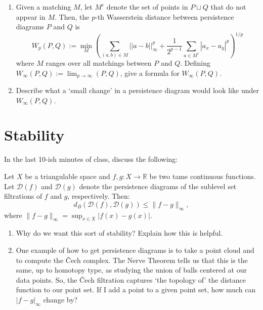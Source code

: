 \documentclass{article}
\begin{document}
\begin{enumerate}[itemsep=2in]
        points to match to the diagonal. What is the $d_{\infty}$ distance from
        a point to the diagonal?
    \newpage
    \item Given a matching $M$, let $M^c$ denote the set of points in $P \sqcup
        Q$ that do not appear in $M$.  Then, the $p$-th Wasserstein distance
        between persistence diagrams $P$ and $Q$ is
        $$
            W_p(P,Q):=\min_M \left( \sum_{(a,b)\in M} ||a-b||^p_{\infty}
            + \frac{1}{2^{p-1}} \sum_{a \in M^c} |a_x-a_y|^p
            \right)^{1/p}
        $$
        where $M$ ranges over all matchings between $P$ and $Q$. Defining
        $W_{\infty}(P,Q):=\lim_{p \to \infty}(P,Q)$, give a formula for
        $W_{\infty}(P,Q)$.
    \item Describe what a `small change' in a persistence diagram would look
        like under $W_{\infty}(P,Q)$.
\end{enumerate}

\pagebreak
\section*{Stability}

In the last 10-ish minutes of class, discuss the following:

\begin{theorem}
    Let $X$ be a triangulable space and $f, g: X \to \mathbb{R}$ be two tame
    continuous functions. Let $\mathcal{D}(f)$ and $\mathcal{D}(g)$ denote the
    persistence diagrams of the sublevel set filtrations of $f$ and $g$,
    respectively. Then:
    $$
        d_B(\mathcal{D}(f), \mathcal{D}(g)) \leq \|f - g\|_\infty,
    $$
    where $\|f - g\|_\infty = \sup_{x \in
    X} |f(x) - g(x)|$.
\end{theorem}

\begin{enumerate}[itemsep=2in]
    \item Why do we want this sort of stability? Explain how this is helpful.
    \item One example of how to get persistence diagrams is to take a point
        cloud and to compute the \v{C}ech complex. The Nerve Theorem tells us
        that this is the same, up to homotopy type, as studying the union of
        balls centered at our data points.  So, the \v{C}ech filtration captures
        `the topology of' the distance function to our point set.  If I add a
        point to a given point set, how much can $|f-g|_{\infty}$ change by?
\end{enumerate}
\end{document}
